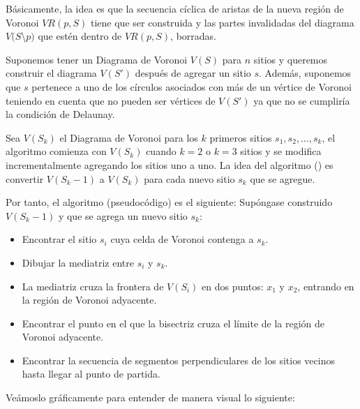 Básicamente, la idea es que la secuencia cíclica de aristas de la nueva región de Voronoi $VR(p,S)$ tiene que ser construida y las partes invalidadas del diagrama $V(S$\textbackslash${p})$ que estén dentro de $VR(p,S)$, borradas.
\vspace{0.3cm}

Suponemos tener un Diagrama de Voronoi $V(S)$ para $n$ sitios y queremos construir el diagrama $V(S')$ después de agregar un sitio $s$. Además, suponemos que $s$ pertenece a uno de los círculos asociados con más de un vértice de Voronoi teniendo en cuenta que no pueden ser vértices de $V(S')$ ya que no se cumpliría la condición de Delaunay.


Sea $V(S_{k})$ el Diagrama de Voronoi para los $k$ primeros sitios $s_{1}, s_{2}, ..., s_{k}$, el algoritmo comienza con $V(S_{k})$ cuando $k=2$ o $k=3$ sitios y se modifica incrementalmente agregando los sitios uno a uno. La idea del algoritmo (\cite{fotosincremental}) es convertir $V(S_{k}-1)$ a $V(S_{k})$ para cada nuevo sitio $s_{k}$ que se agregue. 

Por tanto, el algoritmo (pseudocódigo) es el siguiente: 
    Supóngase construido $V(S_{k}-1)$ y que se agrega un nuevo sitio $s_{k}$:
    \begin{itemize}
        \item Encontrar el sitio $s_{i}$ cuya celda de Voronoi contenga a $s_{k}$.
        \item Dibujar la mediatriz entre $s_{i}$ y $s_{k}$.
        \item La mediatriz cruza la frontera de $V(S_{i})$ en dos puntos: $x_{1}$ y $x_{2}$, entrando en la región de Voronoi adyacente.
        \item Encontrar el punto en el que la bisectriz cruza el límite de la región de Voronoi adyacente.
        \item Encontrar la secuencia de segmentos perpendiculares de los sitios vecinos hasta llegar al punto de partida.
    \end{itemize}


\vspace{0.3cm}
    
Veámoslo gráficamente para entender de manera visual lo siguiente:

